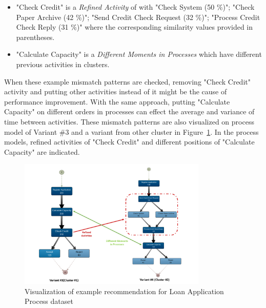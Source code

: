 \begin{itemize}
		\begin{itemize}
		\item "Check Credit" is a \textit{Refined Activity} of with "Check System (50 \%)"; "Check Paper Archive (42 \%)"; "Send Credit Check Request (32 \%)"; "Process Credit Check Reply (31 \%)" where the corresponding similarity values provided in parentheses.
		\item "Calculate Capacity" is a \textit{Different Moments in Processes} which have different previous activities in clusters. 
		\end{itemize}
	When these example mismatch patterns are checked, removing "Check Credit" activity and putting other activities instead of it might be the cause of performance improvement. With the same approach, putting "Calculate Capacity" on different orders in processes can effect the average and variance of time between activities. These mismatch patterns are also visualized on process model of Variant \#3 and a variant from other cluster in Figure~\ref{fig:loan-recommendation-visualization}. In the process models, refined activities of "Check Credit" and different positions of "Calculate Capacity" are indicated. 
		\begin{figure}
			\centering
			\includegraphics[width=0.8\textwidth]{5_results_discussions/loan-application-process/recommendation-visualization}
			\caption{Visualization of example recommendation for Loan Application Process dataset}
		  \label{fig:loan-recommendation-visualization}
		\end{figure}
\end{itemize} %
